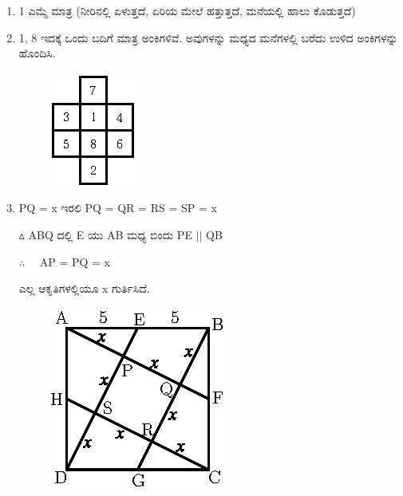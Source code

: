 \begin{enumerate}
\item 1 ಎಮ್ಮೆ ಮಾತ್ರ (ನೀರಿನಲ್ಲಿ ಏಳುತ್ತದೆ, ಏರಿಯ ಮೇಲೆ ಹತ್ತುತ್ತದೆ, ಮನೆಯಲ್ಲಿ ಹಾಲು ಕೊಡುತ್ತದೆ)

\item 1, 8 ಇದಕ್ಕೆ ಒಂದು ಬದಿಗೆ ಮಾತ್ರ ಅಂಕಿಗಳಿವೆ. ಅವುಗಳನ್ನು ಮಧ್ಯದ ಮನೆಗಳಲ್ಲಿ ಬರೆದು ಉಳಿದ ಅಂಕಿಗಳನ್ನು ಹೊಂದಿಸಿ. 

\begin{figure}[H]
\centering
\includegraphics[scale=1.1]{images/chap3/ans28.eps}
\end{figure}

\item PQ = x ಇರಲಿ  PQ = QR = RS = SP = x

$\vartriangle$ ABQ ದಲ್ಲಿ  E ಯು AB ಮಧ್ಯ ಬಿಂದು PE $||$  QB

$\therefore\quad$ AP = PQ = x

ಎಲ್ಲ ಆಕೃತಿಗಳಲ್ಲಿಯೂ x ಗುರ್ತಿಸಿದೆ.  
\begin{figure}[H]
\centering
\includegraphics[scale=1.5]{images/chap3/ans29.eps}
\end{figure}


\end{enumerate}
